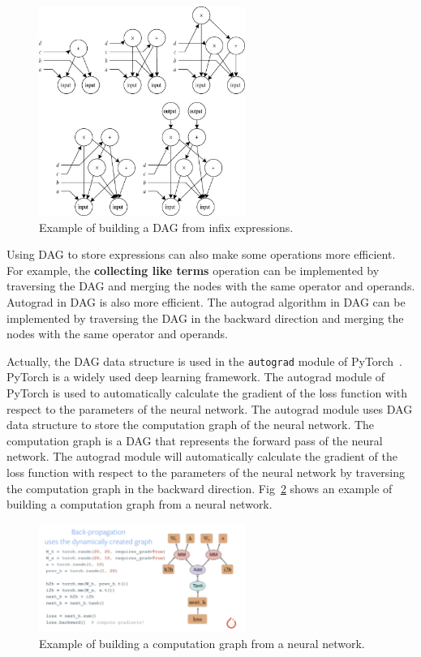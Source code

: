 \documentclass[a4paper,oneside]{book}
\begin{document}
\begin{figure}[!ht]
    \caption{Example of building a DAG from infix expressions.}\label{fig:dag}
    \centering
    \includegraphics[width=0.6\textwidth]{src/dag.jpeg}
\end{figure}

Using DAG to store expressions can also make some operations more efficient. For example, the \textbf{collecting like terms} operation can be implemented by traversing the DAG and merging the nodes with the same operator and operands. Autograd in DAG is also more efficient. The autograd algorithm in DAG can be implemented by traversing the DAG in the backward direction and merging the nodes with the same operator and operands.

Actually, the DAG data structure is used in the \verb|autograd| module of PyTorch~\cite{paszke2017automatic}. PyTorch is a widely used deep learning framework. The autograd module of PyTorch is used to automatically calculate the gradient of the loss function with respect to the parameters of the neural network. The autograd module uses DAG data structure to store the computation graph of the neural network. The computation graph is a DAG that represents the forward pass of the neural network. The autograd module will automatically calculate the gradient of the loss function with respect to the parameters of the neural network by traversing the computation graph in the backward direction. Fig~\ref{fig:pytorch} shows an example of building a computation graph from a neural network.

\begin{figure}[!ht]
    \caption{Example of building a computation graph from a neural network.}\label{fig:pytorch}
    \centering
    \includegraphics[width=0.6\textwidth]{src/pytorch.png}
\end{figure}
\end{document}
